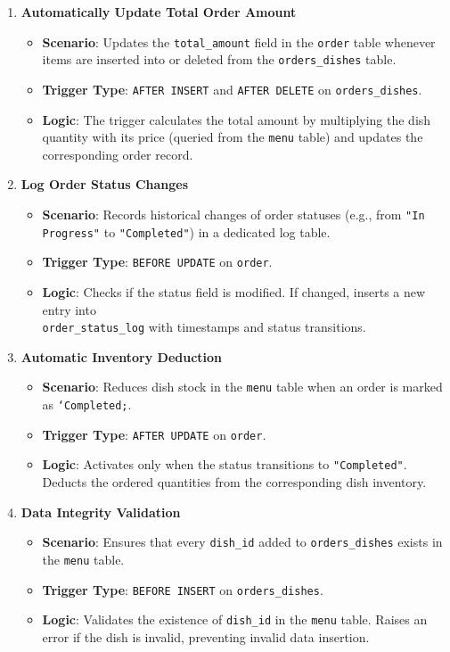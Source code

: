 \documentclass[12pt]{article}
\begin{document}
\begin{enumerate}
\item \textbf{Automatically Update Total Order Amount}
\begin{itemize}
\item \textbf{Scenario}: Updates the \texttt{total\_amount} field in the \texttt{order} table whenever items are inserted into or deleted from the \texttt{orders\_dishes} table.
\item \textbf{Trigger Type}: \texttt{AFTER INSERT} and \texttt{AFTER DELETE} on \texttt{orders\_dishes}.
\item \textbf{Logic}: The trigger calculates the total amount by multiplying the dish quantity with its price (queried from the \texttt{menu} table) and updates the corresponding order record.
\end{itemize}

\item \textbf{Log Order Status Changes}  
\begin{itemize}
    \item \textbf{Scenario}: Records historical changes of order statuses (e.g., from \texttt{"In Progress"} to \texttt{"Completed"}) in a dedicated log table.  
    \item \textbf{Trigger Type}: \texttt{BEFORE UPDATE} on \texttt{order}.  
    \item \textbf{Logic}: Checks if the status field is modified. If changed, inserts a new entry into \\
     \texttt{order\_status\_log} with timestamps and status transitions.  
\end{itemize}

\item \textbf{Automatic Inventory Deduction}  
\begin{itemize}
    \item \textbf{Scenario}: Reduces dish stock in the \texttt{menu} table when an order is marked as \texttt{`Completed;}.  
    \item \textbf{Trigger Type}: \texttt{AFTER UPDATE} on \texttt{order}.  
    \item \textbf{Logic}: Activates only when the status transitions to \texttt{"Completed"}. Deducts the ordered quantities from the corresponding dish inventory.  
\end{itemize}

\item \textbf{Data Integrity Validation}  
\begin{itemize}
    \item \textbf{Scenario}: Ensures that every \texttt{dish\_id} added to \texttt{orders\_dishes} exists in the \texttt{menu} table.  
    \item \textbf{Trigger Type}: \texttt{BEFORE INSERT} on \texttt{orders\_dishes}.  
    \item \textbf{Logic}: Validates the existence of \texttt{dish\_id} in the \texttt{menu} table. Raises an error if the dish is invalid, preventing invalid data insertion.  
\end{itemize}

\end{enumerate}
\end{document}
